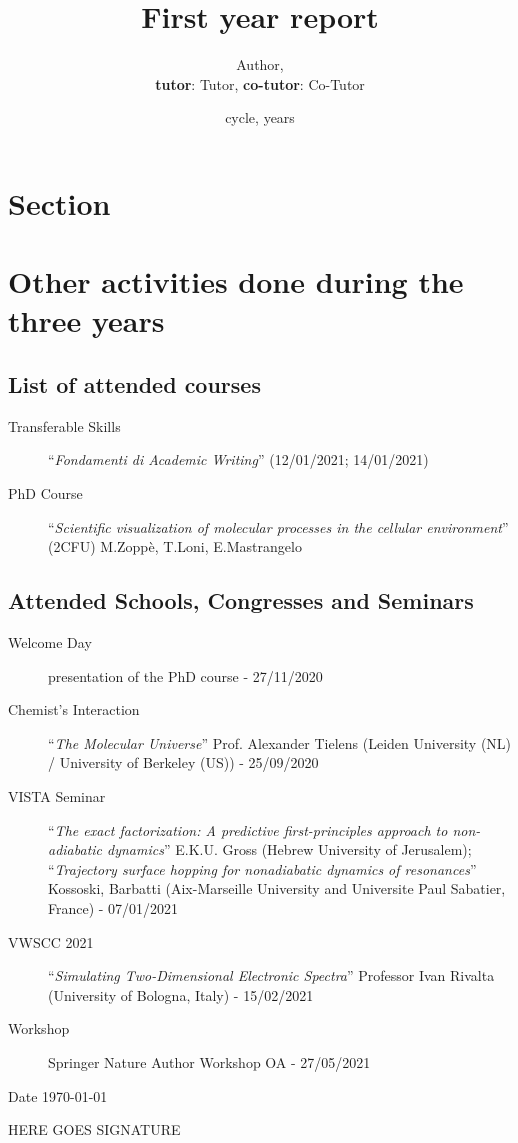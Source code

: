 \documentclass[11pt]{article}
\title{First year report}
\author{Author, \\ \textbf{tutor}: Tutor, \textbf{co-tutor}: Co-Tutor}
\date{cycle, years}
\begin{document}
\maketitle\thispagestyle{fancy}

\section*{Section}
\cite{Conte_Ceotto_formaldehydePESs_2020}

\printbibliography[title=Bibliography] 

\section*{Other activities done during the three years}

\subsection*{List of attended courses}
\begin{description}
\item[Transferable Skills] ``\textit{Fondamenti di Academic Writing}'' (12/01/2021; 14/01/2021)
\item[PhD Course] ``\textit{Scientific visualization of molecular processes in the cellular environment}'' (2CFU) M.Zopp\`{e}, T.Loni, E.Mastrangelo
\end{description}

\subsection*{Attended Schools, Congresses and Seminars}

\begin{description}
\item[Welcome Day] presentation of the PhD course - 27/11/2020
\item[Chemist's Interaction] ``\textit{The Molecular Universe}'' Prof. Alexander Tielens (Leiden University (NL) / University of Berkeley (US)) - 25/09/2020
\item[VISTA Seminar] ``\textit{The exact factorization:  A predictive first-principles approach to non-adiabatic dynamics}'' E.K.U. Gross (Hebrew University of Jerusalem); ``\textit{Trajectory surface hopping for nonadiabatic dynamics of resonances}'' Kossoski, Barbatti (Aix-Marseille University and Universite Paul Sabatier, France) - 07/01/2021

\item[VWSCC 2021] ``\textit{Simulating Two-Dimensional Electronic Spectra}'' Professor Ivan Rivalta (University of Bologna, Italy) - 15/02/2021

\item[Workshop] Springer Nature Author Workshop OA - 27/05/2021
\end{description}

\begin{flushleft}
Date \today
\end{flushleft}

HERE GOES SIGNATURE
\end{document}
